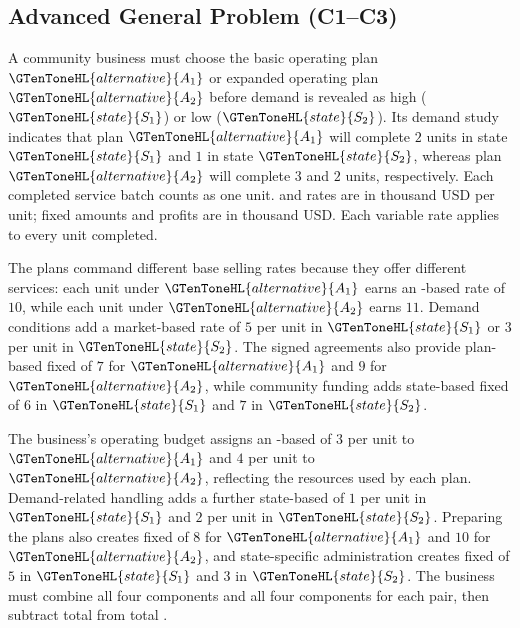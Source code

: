 	\subsection{Advanced General Problem (C1--C3)}
	\label{sec:problem2-advanced-general-c1-c3}

	A community business must choose the basic operating plan \(\GTenToneHL{alternative}{A_1}\) or expanded operating plan \(\GTenToneHL{alternative}{A_2}\) before demand is revealed as high (\(\GTenToneHL{state}{S_1}\)) or low (\(\GTenToneHL{state}{S_2}\)). Its demand study indicates that plan \(\GTenToneHL{alternative}{A_1}\) will complete \(2\) units in state \(\GTenToneHL{state}{S_1}\) and \(1\) in state \(\GTenToneHL{state}{S_2}\), whereas plan \(\GTenToneHL{alternative}{A_2}\) will complete \(3\) and \(2\) units, respectively. Each completed service batch counts as one unit.  and  rates are in thousand USD per unit; fixed amounts and profits are in thousand USD. Each variable rate applies to every unit completed.

	The plans command different base selling rates because they offer different services: each unit under \(\GTenToneHL{alternative}{A_1}\) earns an -based  rate of \(10\), while each unit under \(\GTenToneHL{alternative}{A_2}\) earns \(11\). Demand conditions add a market-based  rate of \(5\) per unit in \(\GTenToneHL{state}{S_1}\) or \(3\) per unit in \(\GTenToneHL{state}{S_2}\). The signed agreements also provide plan-based fixed  of \(7\) for \(\GTenToneHL{alternative}{A_1}\) and \(9\) for \(\GTenToneHL{alternative}{A_2}\), while community funding adds state-based fixed  of \(6\) in \(\GTenToneHL{state}{S_1}\) and \(7\) in \(\GTenToneHL{state}{S_2}\).

	The business's operating budget assigns an -based  of \(3\) per unit to \(\GTenToneHL{alternative}{A_1}\) and \(4\) per unit to \(\GTenToneHL{alternative}{A_2}\), reflecting the resources used by each plan. Demand-related handling adds a further state-based  of \(1\) per unit in \(\GTenToneHL{state}{S_1}\) and \(2\) per unit in \(\GTenToneHL{state}{S_2}\). Preparing the plans also creates fixed  of \(8\) for \(\GTenToneHL{alternative}{A_1}\) and \(10\) for \(\GTenToneHL{alternative}{A_2}\), and state-specific administration creates fixed  of \(5\) in \(\GTenToneHL{state}{S_1}\) and \(3\) in \(\GTenToneHL{state}{S_2}\). The business must combine all four  components and all four  components for each pair, then subtract total  from total .

